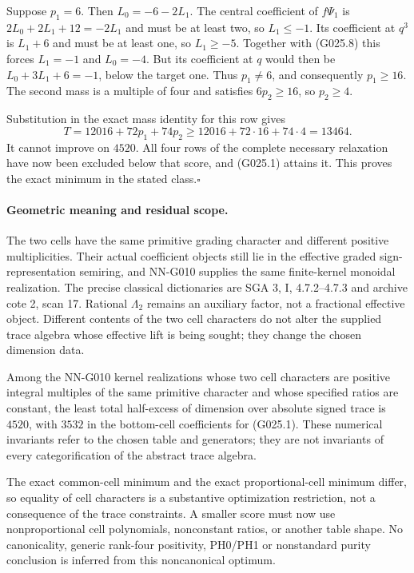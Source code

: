 Suppose $p_1=6$. Then $L_0=-6-2L_1$.
The central coefficient of $f\Psi_1$ is
$2L_0+2L_1+12=-2L_1$ and must be at least two,
so $L_1\le-1$. Its coefficient at $q^3$ is
$L_1+6$ and must be at least one, so $L_1\ge-5$.
Together with (G025.8) this forces $L_1=-1$ and
$L_0=-4$. But its coefficient at $q$ would then be
$L_0+3L_1+6=-1$, below the target one.
Thus $p_1\ne6$, and consequently $p_1\ge16$.
The second mass is a multiple of four and satisfies
$6p_2\ge16$, so $p_2\ge4$.

Substitution in the exact mass identity for this row gives
\[
 T=12016+72p_1+74p_2
   \ge12016+72\cdot16+74\cdot4=13464.
\]
It cannot improve on $4520$. All four rows of the
complete necessary relaxation have now been excluded
below that score, and (G025.1) attains it. This proves
the exact minimum in the stated class.\hfill$\square$

\paragraph{Geometric meaning and residual scope.}
The two cells have the same primitive grading character
and different positive multiplicities. Their actual
coefficient objects still lie in the effective graded
sign-representation semiring, and NN-G010 supplies the
same finite-kernel monoidal realization. The precise
classical dictionaries are SGA 3, I, 4.7.2--4.7.3 and
archive cote 2, scan 17. Rational $\Lambda_2$ remains
an auxiliary factor, not a fractional effective object.
Different contents of the two cell characters do not
alter the supplied trace algebra whose effective lift
is being sought; they change the chosen dimension data.

Among the NN-G010 kernel realizations whose two cell characters
are positive integral multiples of the same primitive character
and whose specified ratios are constant, the least total
half-excess of dimension over absolute signed trace is $4520$,
with $3532$ in the bottom-cell coefficients for (G025.1).
These numerical invariants refer to the chosen table and
generators; they are not invariants of every categorification
of the abstract trace algebra.

The exact common-cell minimum and the exact proportional-cell
minimum differ, so equality of cell characters is a
substantive optimization restriction, not a consequence
of the trace constraints. A smaller score must now use
nonproportional cell polynomials, nonconstant ratios,
or another table shape. No canonicality, generic
rank-four positivity, PH0/PH1 or nonstandard purity
conclusion is inferred from this noncanonical optimum.



